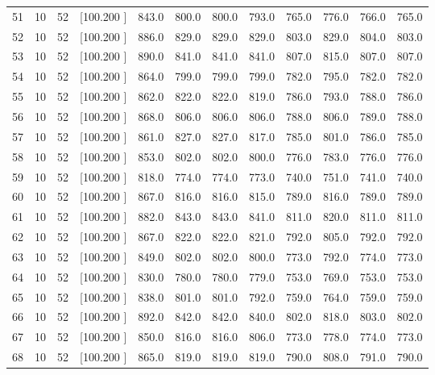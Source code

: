 \documentclass[12pt,a4paper]{article}
\begin{document}
\begin{center}
{\begin{tabular}{r r r r r r r r r r r r}
  51& 10& 52&[100.200   ]&   843.0&   800.0&   800.0&   793.0&   765.0&   776.0&   766.0&   765.0\\[-0.02in]
  52& 10& 52&[100.200   ]&   886.0&   829.0&   829.0&   829.0&   803.0&   829.0&   804.0&   803.0\\[-0.02in]
  53& 10& 52&[100.200   ]&   890.0&   841.0&   841.0&   841.0&   807.0&   815.0&   807.0&   807.0\\[-0.02in]
  54& 10& 52&[100.200   ]&   864.0&   799.0&   799.0&   799.0&   782.0&   795.0&   782.0&   782.0\\[-0.02in]
  55& 10& 52&[100.200   ]&   862.0&   822.0&   822.0&   819.0&   786.0&   793.0&   788.0&   786.0\\[-0.02in]
  56& 10& 52&[100.200   ]&   868.0&   806.0&   806.0&   806.0&   788.0&   806.0&   789.0&   788.0\\[-0.02in]
  57& 10& 52&[100.200   ]&   861.0&   827.0&   827.0&   817.0&   785.0&   801.0&   786.0&   785.0\\[-0.02in]
  58& 10& 52&[100.200   ]&   853.0&   802.0&   802.0&   800.0&   776.0&   783.0&   776.0&   776.0\\[-0.02in]
  59& 10& 52&[100.200   ]&   818.0&   774.0&   774.0&   773.0&   740.0&   751.0&   741.0&   740.0\\[-0.02in]
  60& 10& 52&[100.200   ]&   867.0&   816.0&   816.0&   815.0&   789.0&   816.0&   789.0&   789.0\\[-0.02in]
  61& 10& 52&[100.200   ]&   882.0&   843.0&   843.0&   841.0&   811.0&   820.0&   811.0&   811.0\\[-0.02in]
  62& 10& 52&[100.200   ]&   867.0&   822.0&   822.0&   821.0&   792.0&   805.0&   792.0&   792.0\\[-0.02in]
  63& 10& 52&[100.200   ]&   849.0&   802.0&   802.0&   800.0&   773.0&   792.0&   774.0&   773.0\\[-0.02in]
  64& 10& 52&[100.200   ]&   830.0&   780.0&   780.0&   779.0&   753.0&   769.0&   753.0&   753.0\\[-0.02in]
  65& 10& 52&[100.200   ]&   838.0&   801.0&   801.0&   792.0&   759.0&   764.0&   759.0&   759.0\\[-0.02in]
  66& 10& 52&[100.200   ]&   892.0&   842.0&   842.0&   840.0&   802.0&   818.0&   803.0&   802.0\\[-0.02in]
  67& 10& 52&[100.200   ]&   850.0&   816.0&   816.0&   806.0&   773.0&   778.0&   774.0&   773.0\\[-0.02in]
  68& 10& 52&[100.200   ]&   865.0&   819.0&   819.0&   819.0&   790.0&   808.0&   791.0&   790.0\\[-0.02in]

\end{tabular}}
\end{center}
\end{document}
